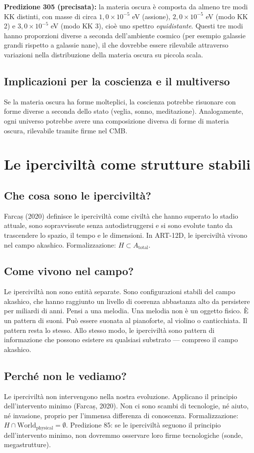 \textbf{Predizione 305 (precisata):} la materia oscura è composta da almeno tre modi KK distinti, con masse di circa $1,0\times10^{-5}$ eV (assione), $2,0\times10^{-5}$ eV (modo KK 2) e $3,0\times10^{-5}$ eV (modo KK 3), cioè uno spettro \emph{equidistante}. Questi tre modi hanno proporzioni diverse a seconda dell'ambiente cosmico (per esempio galassie grandi rispetto a galassie nane), il che dovrebbe essere rilevabile attraverso variazioni nella distribuzione della materia oscura su piccola scala.

\subsection{Implicazioni per la coscienza e il multiverso}
Se la materia oscura ha forme molteplici, la coscienza potrebbe risuonare con forme diverse a seconda dello stato (veglia, sonno, meditazione). Analogamente, ogni universo potrebbe avere una composizione diversa di forme di materia oscura, rilevabile tramite firme nel CMB.

\section{Le iperciviltà come strutture stabili}
\subsection{Che cosa sono le iperciviltà?}
Farcaș (2020) definisce le iperciviltà come civiltà che hanno superato lo stadio attuale, sono sopravvissute senza autodistruggersi e si sono evolute tanto da trascendere lo spazio, il tempo e le dimensioni. In ART-12D, le iperciviltà vivono nel campo akashico. Formalizzazione: $H \subset A_{\text{total}}$.

\subsection{Come vivono nel campo?}
Le iperciviltà non sono entità separate. Sono configurazioni stabili del campo akashico, che hanno raggiunto un livello di coerenza abbastanza alto da persistere per miliardi di anni. Pensi a una melodia. Una melodia non è un oggetto fisico. È un pattern di suoni. Può essere suonata al pianoforte, al violino o canticchiata. Il pattern resta lo stesso. Allo stesso modo, le iperciviltà sono pattern di informazione che possono esistere su qualsiasi substrato --- compreso il campo akashico.

\subsection{Perché non le vediamo?}
Le iperciviltà non intervengono nella nostra evoluzione. Applicano il principio dell'intervento minimo (Farcaș, 2020). Non ci sono scambi di tecnologie, né aiuto, né invasione, proprio per l'immensa differenza di conoscenza. Formalizzazione: $H \cap \text{World}_{\text{physical}} = \emptyset$. Predizione 85: se le iperciviltà seguono il principio dell'intervento minimo, non dovremmo osservare loro firme tecnologiche (sonde, megastrutture).

